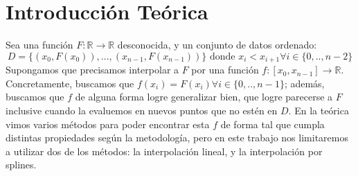 \documentclass{article}
\begin{document}
{} %



\maketitle

\pagebreak

\tableofcontents

\pagebreak

\section{Introducción Teórica}

Sea una función $F: \mathbb{R} \to \mathbb{R}$ desconocida, y un conjunto de datos ordenado: $$D = \{(x_0, F(x_0)), ..., (x_{n-1}, F(x_{n-1}))\} \text{ donde } x_i < x_{i+1} \forall i \in \{0, .., n-2\}$$
Supongamos que precisamos interpolar a $F$ por una función $f: [x_0, x_{n-1}] \to \mathbb{R}$. Concretamente, buscamos que $f(x_i) = F(x_i) \forall i \in \{0, .., n-1\}$; además, buscamos que $f$ de alguna forma logre generalizar bien, que logre parecerse a $F$ inclusive cuando la evaluemos en nuevos puntos que no estén en $D$. En la teórica vimos varios métodos para poder encontrar esta $f$ de forma tal que cumpla distintas propiedades según la metodología, pero en este trabajo nos limitaremos a utilizar dos de los métodos: la interpolación lineal, y la interpolación por splines.
\end{document}
